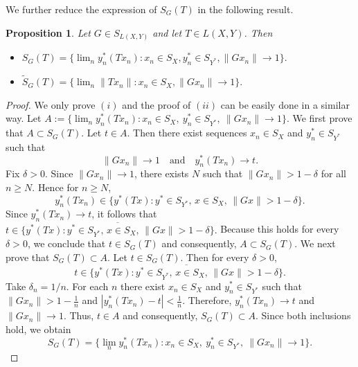 \documentclass[12pt]{amsart}
\newtheorem{proposition}[theorem]{Proposition}
\theoremstyle{definition}
\numberwithin{equation}{section}
\begin{document}
	We further reduce the expression of $S_G(T)$ in the following result.
	
	\begin{proposition}\label{P2.2}
		Let $G\in S_{L(X,Y)}$ and let $T\in L(X,Y)$. Then
		\begin{itemize}
			\item[(i)] $S_G(T)=
			\Big\{\lim_{n} y_n^*(Tx_n):
			x_n\in S_X, y_n^*\in S_{Y^*}, \|Gx_n\|\to 1 \Big\}.$
			\item[(ii)] $\widetilde{S}_G(T)=
			\Big\{\lim_{n} \|Tx_n\|:
			x_n\in S_X, \|Gx_n\|\to 1 \Big\}.$ 
		\end{itemize}
	\end{proposition}
	
	\begin{proof}
		We only prove $(i)$ and the proof of $(ii)$ can be easily done in a similar way. Let $A:=\Big\{\lim_{n} y_n^*(Tx_n):x_n\in S_X,\ y_n^*\in S_{Y^*},\ \|Gx_n\|\to 1 \Big\}.$ We first prove that $A\subset S_G(T)$. Let $t\in A$. Then there exist sequences $x_n\in S_X$ and 
		$y_n^*\in S_{Y^*}$ such that
		\[
		\|Gx_n\|\to 1\quad\text{and}\quad y_n^*(Tx_n)\to t.
		\]
		Fix $\delta>0$. Since $\|Gx_n\|\to 1$, there exists $N$ such that $\|Gx_n\|>1-\delta$ for all $n\ge N.$ Hence for $n\ge N$,
		\[
		y_n^*(Tx_n)\in \{y^*(Tx):y^*\in S_{Y^*},\,x\in S_X,\,\|Gx\|>1-\delta\}.
		\]
		Since $y_n^*(Tx_n)\to t$, it follows that $t\in \overline{\{y^*(Tx):y^*\in S_{Y^*},\,x\in S_X,\,\|Gx\|>1-\delta\}}.$ Because this holds for every $\delta>0$, we conclude that $t\in S_G(T)$ and consequently, $A\subset S_G(T)$. We next prove that $S_G(T)\subset A$. Let $t\in S_G(T)$. Then for every $\delta>0$,
		\[
		t\in
		\overline{\{y^*(Tx):y^*\in S_{Y^*},\,x\in S_X,\,\|Gx\|>1-\delta\}}.
		\]
		Take $\delta_n=1/n$. For each $n$ there exist $x_n\in S_X$ and
		$y_n^*\in S_{Y^*}$ such that $\|Gx_n\|>1-\frac1n$ and $|y_n^*(Tx_n)-t|<\frac1n.$ Therefore, $y_n^*(Tx_n)\to t$ and $\|Gx_n\|\to 1.$ Thus, $t\in A$ and consequently, $S_G(T)\subset A$. Since both inclusions hold, we obtain
		\[
		S_G(T)=
		\Big\{\lim_{n} y_n^*(Tx_n):
		x_n\in S_X,\ y_n^*\in S_{Y^*},\ \|Gx_n\|\to 1 \Big\}.
		\]
	\end{proof}
	
	
	
	
\end{document}
